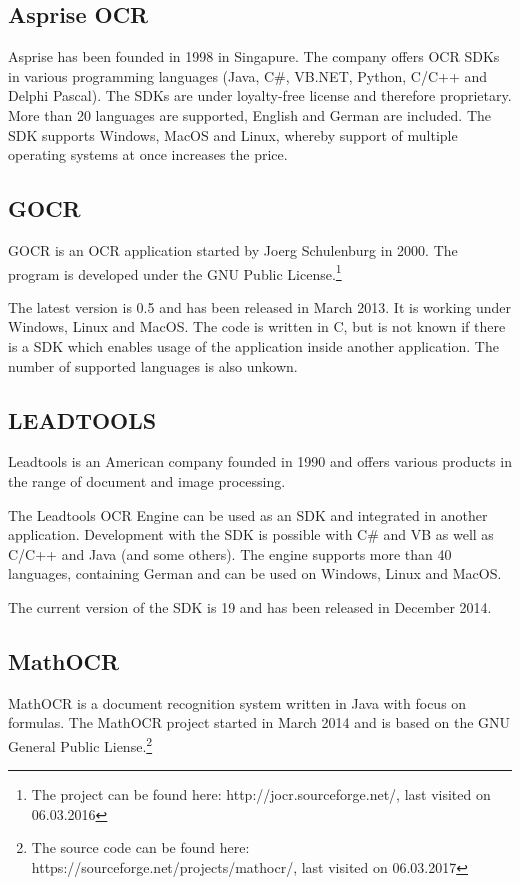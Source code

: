 \subsection{Asprise OCR}
\label{sec3.1.3}
Asprise has been founded in 1998 in Singapure. The company offers OCR SDKs in various programming languages (Java, C\#, VB.NET, Python, C/C++ and Delphi Pascal). The SDKs are under loyalty-free license and therefore proprietary. More than 20 languages are supported, English and German are included.
The SDK supports Windows, MacOS and Linux, whereby support of multiple operating systems at once increases the price.

\subsection{GOCR}
\label{sec3.1.4}
GOCR is an OCR application started by Joerg Schulenburg in 2000. The program is developed under the GNU Public License.\footnote{The project can be found here: http://jocr.sourceforge.net/, last visited on 06.03.2016}

The latest version is 0.5 and has been released in March 2013. It is working under Windows, Linux and MacOS. The code is written in C, but is not known if there is a SDK which enables usage of the application inside another application. The number of supported languages is also unkown.

\subsection{LEADTOOLS}
\label{sec3.1.5}
Leadtools is an American company founded in 1990 and offers various products in the range of document and image processing. 

The Leadtools OCR Engine can be used as an SDK and integrated in another application. Development with the SDK is possible with C\# and VB as well as C/C++ and Java (and some others). The engine supports more than 40 languages, containing German and can be used on Windows, Linux and MacOS. 

The current version of the SDK is 19 and has been released in December 2014.

\subsection{MathOCR}
\label{sec3.1.6}
MathOCR is a document recognition system written in Java with focus on formulas. The MathOCR project started in March 2014 and is based on the GNU General Public Liense.\footnote{The source code can be found here: https://sourceforge.net/projects/mathocr/, last visited on 06.03.2017}

